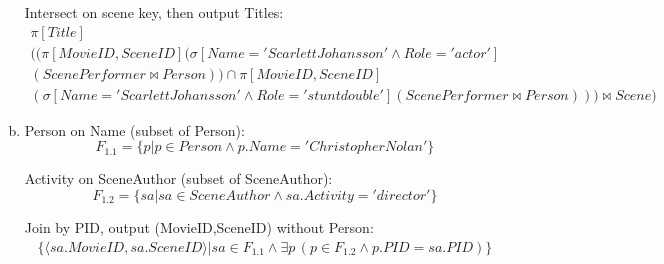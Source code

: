 \documentclass{article}
\begin{document}
\begin{enumerate}[(a)]
Intersect on scene key, then output Titles:
\begin{multline}
\pi\left[Title\right]\\
 ((\pi\left[MovieID,SceneID\right](\sigma\left[Name='Scarlett Johansson' \land Role='actor'\right]\\
 (ScenePerformer \Join Person)) \cap \pi\left[MovieID,SceneID\right]\\
 (\sigma\left[Name='Scarlett Johansson' \land Role='stunt double'\right](ScenePerformer \Join Person))) \Join Scene
)
\end{multline}

\item
Person on Name (subset of Person):
\begin{equation}
F_{1.1} = \{p | p \in Person \land p.Name='Christopher Nolan' \}
\end{equation}

Activity on SceneAuthor (subset of SceneAuthor):
\begin{equation}
F_{1.2} = \{sa | sa \in SceneAuthor \land sa.Activity='director' \}
\end{equation}

Join by PID, output (MovieID,SceneID) without Person:
\begin{multline}
\{\langle sa.MovieID, sa.SceneID \rangle | sa \in F_{1.1} \land \exists p\,(p \in F_{1.2} \land p.PID = sa.PID)\}
\end{multline}


\end{enumerate}
\end{document}
